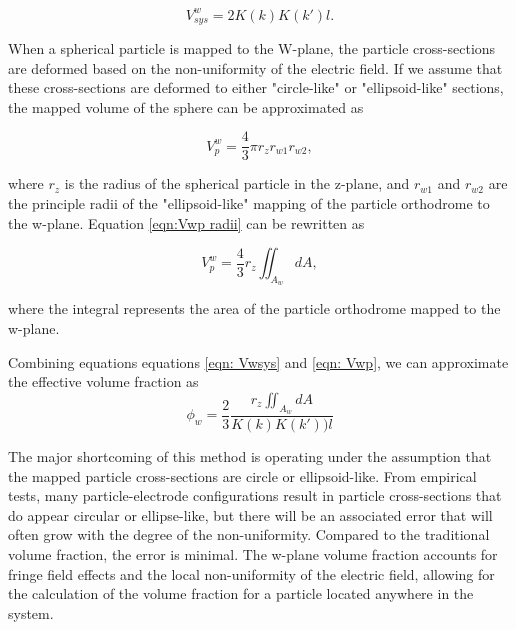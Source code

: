 \begin{equation}
    V^w_{sys} = 2K(k)K(k')l.
    \label{eqn: Vwsys}
\end{equation}

\par When a spherical particle is mapped to the W-plane, the particle cross-sections are deformed based on the non-uniformity of the electric field. If we assume that these cross-sections are deformed to either "circle-like" or "ellipsoid-like" sections, the mapped volume of the sphere can be approximated as 

\begin{equation}
    V^w_p = \frac{4}{3}\pi r_z r_{w1} r_{w2},
    \label{eqn:Vwp radii}
\end{equation}

\noindent where $r_z$ is the radius of the spherical particle in the z-plane, and $r_{w1}$ and $r_{w2}$ are the principle radii of the "ellipsoid-like" mapping of the particle orthodrome to the w-plane. Equation \ref{eqn:Vwp radii} can be rewritten as 

\begin{equation}
    V^w_p = \frac{4}{3} r_z \iint_{A_w} dA,
    \label{eqn: Vwp}
\end{equation}

\noindent where the integral represents the area of the particle orthodrome mapped to the w-plane. 

\par Combining equations equations \ref{eqn: Vwsys} and \ref{eqn: Vwp}, we can approximate the effective volume fraction as
\begin{equation}
    \phi_w = \frac{2}{3} \frac{r_z \iint_{A_w} dA}{K(k)K(k'))l}
\end{equation}

\par The major shortcoming of this method is operating under the assumption that the mapped particle cross-sections are circle or ellipsoid-like. From empirical tests, many particle-electrode configurations result in particle cross-sections that do appear circular or ellipse-like, but there will be an associated error that will often grow with the degree of the non-uniformity. Compared to the traditional volume fraction, the error is minimal. The w-plane volume fraction accounts for fringe field effects and the local non-uniformity of the electric field, allowing for the calculation of the volume fraction for a particle located anywhere in the system. 

